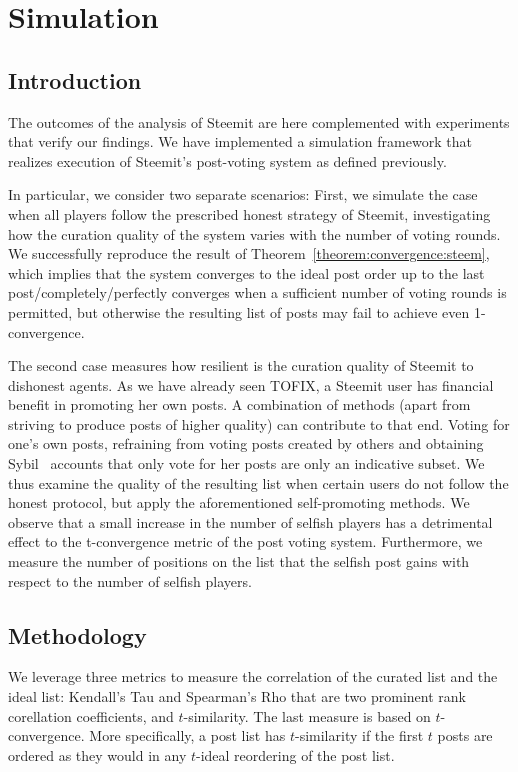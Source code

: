 \section{Simulation}
  \subsection{Introduction}
    The outcomes of the analysis of Steemit are here complemented with
    experiments that verify our findings. We have implemented a simulation
    framework that realizes execution of Steemit's post-voting system as defined
    previously.

    In particular, we consider two separate scenarios: First, we simulate the
    case when all players follow the prescribed honest strategy of Steemit,
    investigating how the curation quality of the system varies with the number
    of voting rounds. We successfully reproduce the result of
    Theorem~\ref{theorem:convergence:steem}, which implies that the system
    converges to the ideal post order up to the last post/completely/perfectly
    converges when a sufficient number of voting rounds is permitted, but
    otherwise the resulting list of posts may fail to achieve even
    1-convergence.

    The second case measures how resilient is the curation quality of Steemit to
    dishonest agents. As we have already seen TOFIX, a Steemit user has
    financial benefit in promoting her own posts. A combination of methods
    (apart from striving to produce posts of higher quality) can contribute to
    that end.  Voting for one's own posts, refraining from voting posts created
    by others and obtaining Sybil~\cite{sybilattack} accounts that only vote for
    her posts are only an indicative subset. We thus examine the quality of the
    resulting list when certain users do not follow the honest protocol, but
    apply the aforementioned self-promoting methods. We observe that a small
    increase in the number of selfish players has a detrimental effect to the
    t-convergence metric of the post voting system. Furthermore, we measure the
    number of positions on the list that the selfish post gains with respect to
    the number of selfish players.

  \subsection{Methodology}
    We leverage three metrics to measure the correlation of the curated list and
    the ideal list: Kendall's Tau and Spearman's Rho that are two prominent rank
    corellation coefficients, and $t$-similarity. The last measure is based on
    $t$-convergence. More specifically, a post list has $t$-similarity if the
    first $t$ posts are ordered as they would in any $t$-ideal reordering of the
    post list.

